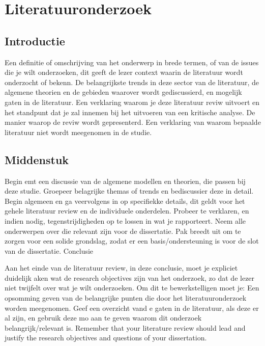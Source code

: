 \newpage

\section{Literatuuronderzoek}





\subsection{Introductie}




Een definitie of omschrijving van het onderwerp in brede termen, of van de issues die je wilt onderzoeken, dit geeft de lezer context waarin de literatuur wordt onderzocht of bekenn. De belangrijkste trends in deze sector van de literatuur, de algemene theorien en de gebieden waarover wordt gediscussierd, en mogelijk gaten in de literatuur.
Een verklaring waarom je deze literatuur reviw uitvoert en het standpunt dat je zal innemen bij het uitvoeren van een kritische analyse.
De manier waarop de reviw wordt gepresenterd.
Een verklaring  van waarom bepaalde literatuur niet wordt meegenomen in de studie.
\subsection{Middenstuk}



Begin emt een discussie van de algemene modellen en theorien, die passen bij deze studie. Groepeer belagrijke themas of trends en bediscussier deze in detail. Begin algemeen en ga veervolgens in op specifiekke details, dit geldt voor het gehele literatuur review en de individuele onderdelen.
Probeer te verklaren, en indien nodig, tegenstrijdigheden  op te lossen in wat je rapporteert. Neem alle onderwerpen over die relevant zijn voor de dissertatie.
Pak breedt uit om te zorgen voor een solide grondslag, zodat er een basis/ondersteuning is voor de slot van de dissertatie.
Conclusie


Aan het einde van de literatuur review, in deze conclusie, moet je expliciet duidelijk aken wat de research objectives zijn  van het onderzoek, zo dat de lezer niet twijfelt over wat je wilt onderzoeken.
Om dit te bewerkstelligen moet je:
Een opsomming geven van de belangrijke punten die door het literatuuronderzoek worden meegenomen.
Geef een overzicht vand e gaten in de literatuur, als deze er al zijn, en gebruik deze mo aan te geven waarom dit onderzoek belangrijk/relevant is.
Remember  that  your  literature  review  should  lead  and  justify  the research objectives and questions of your dissertation.




